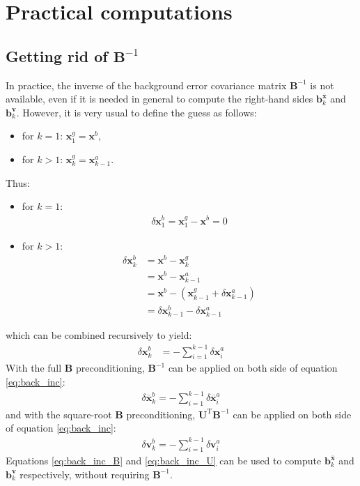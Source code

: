 \documentclass[12pt]{scrartcl}
\begin{document}
\section{Practical computations}

\subsection{Getting rid of $\mathbf{B}^{-1}$}
In practice, the inverse of the background error covariance matrix $\mathbf{B}^{-1}$ is not available, even if it is needed in general to compute the right-hand sides $\mathbf{b}^{\overline{\mathbf{x}}}_k$ and $\mathbf{b}^\mathbf{v}_k$. However, it is very usual to define the guess as follows:
\begin{itemize}
\item for $k = 1$: $\mathbf{x}^g_1 = \mathbf{x}^b$,
\item for $k > 1$: $\mathbf{x}^g_k = \mathbf{x}^a_{k-1}$.
\end{itemize}
Thus:
\begin{itemize}
\item for $k = 1$:
\begin{align}
\delta \mathbf{x}^b_1 = \mathbf{x}^g_1 - \mathbf{x}^b = 0
\end{align}
\item for $k > 1$:
\begin{align}
\delta \mathbf{x}^b_k & = \mathbf{x}^b - \mathbf{x}^g_k \nonumber \\
& = \mathbf{x}^b - \mathbf{x}^a_{k-1} \nonumber \\
& = \mathbf{x}^b - \left(\mathbf{x}^g_{k-1} + \delta \mathbf{x}^a_{k-1}\right) \nonumber \\
& = \delta \mathbf{x}^b_{k-1} - \delta \mathbf{x}^a_{k-1}
\end{align}
\end{itemize}
which can be combined recursively to yield:
\begin{align}
\label{eq:back_inc}
\delta \mathbf{x}^b_k & = - \sum_{i=1}^{k-1} \delta \mathbf{x}^a_i
\end{align}
With the full $\mathbf{B}$ preconditioning, $\mathbf{B}^{-1}$ can be applied on both side of equation \eqref{eq:back_inc}:
\begin{align}
\label{eq:back_inc_B}
\boxed{\delta \overline{\mathbf{x}}^b_k = - \sum_{i=1}^{k-1} \delta \overline{\mathbf{x}}^a_i}
\end{align}
and with the square-root $\mathbf{B}$ preconditioning, $\mathbf{U}^\mathrm{T} \mathbf{B}^{-1}$ can be applied on both side of equation \eqref{eq:back_inc}:
\begin{align}
\label{eq:back_inc_U}
\boxed{\delta \mathbf{v}^b_k = - \sum_{i=1}^{k-1} \delta \mathbf{v}^a_i}
\end{align}
Equations \eqref{eq:back_inc_B} and \eqref{eq:back_inc_U} can be used to compute $\mathbf{b}^{\overline{\mathbf{x}}}_k$ and $\mathbf{b}^\mathbf{v}_k$ respectively, without requiring $\mathbf{B}^{-1}$.
\end{document}
